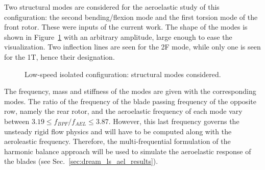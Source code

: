 Two structural modes are considered for the aeroelastic study of this 
configuration: the second bending/flexion mode and the first torsion mode
of the front rotor. These were inputs of the current work.
The shape of the modes is shown in Figure~\ref{fig:dream_ls_ael_modes}
with an arbitrary amplitude, large enough to ease the visualization.
Two inflection lines are seen for the 2F mode, while only
one is seen for the 1T, hence their designation.
\begin{figure}[htp]
  \centering
  \caption{Low-speed isolated configuration: structural modes considered.}
  \label{fig:dream_ls_ael_modes}
\end{figure}
The frequency, mass and stiffness of the modes 
are given with the corresponding modes.
The ratio of the frequency of the blade passing 
frequency of the opposite row, namely the rear rotor,
and the aeroelastic frequency of
each mode vary between 
$3.19 \leq f_{BPF} / f_{AEL} \leq 3.87$. However,
this last frequency governs the unsteady rigid flow physics 
and will have to be computed along with the aeroleastic frequency.
Therefore, the multi-frequential formulation of the
harmonic balance approach will be used to simulate the
aeroelastic response of the blades (see Sec.~\ref{sec:dream_ls_ael_results}).
